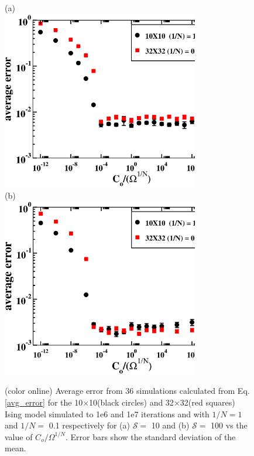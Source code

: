 \documentclass[aps,pre,reprint,superscriptaddress,showkeys]{revtex4-2}
\begin{document}
\begin{figure}[h!]
(a)\\
\includegraphics[width=8.6cm]{fig3a.eps}\\
(b)\\
\includegraphics[width=8.6cm]{fig3b.eps}\\
\caption{(color online) Average error from 36 simulations calculated from Eq. \ref{avg_error} for the 10$\times$10(black circles) and 32$\times$32(red squares) Ising model simulated to 1e6 and 1e7 iterations and  with $1/N=1$ and $1/N=$ 0.1 respectively for (a)  $\mathcal{S}=$ 10 and (b) $\mathcal{S}=$ 100 vs the value of $C_{o}/\Omega^{1/N}$. Error bars show the standard deviation of the mean.  \label{optimalCo}}
\end{figure}
\end{document}
